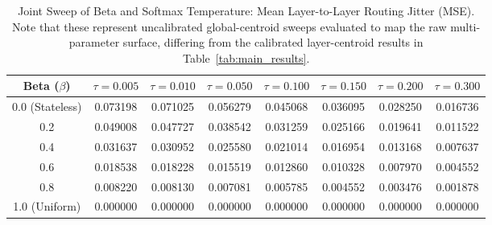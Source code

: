 \documentclass{article}
\theoremstyle{plain}
\theoremstyle{definition}
\theoremstyle{remark}
\begin{document}
\begin{table}[h]
\centering
\caption{Joint Sweep of Beta and Softmax Temperature: Mean Layer-to-Layer Routing Jitter (MSE). Note that these represent uncalibrated global-centroid sweeps evaluated to map the raw multi-parameter surface, differing from the calibrated layer-centroid results in Table~\ref{tab:main_results}.}
\label{tab:joint_jitter}
\vskip 0.1in
\begin{tabular}{cccccccc}
\toprule
\textbf{Beta} ($\beta$) & $\tau = 0.005$ & $\tau = 0.010$ & $\tau = 0.050$ & $\tau = 0.100$ & $\tau = 0.150$ & $\tau = 0.200$ & $\tau = 0.300$ \\
\midrule
0.0 (Stateless) & 0.073198 & 0.071025 & 0.056279 & 0.045068 & 0.036095 & 0.028250 & 0.016736 \\
0.2 & 0.049008 & 0.047727 & 0.038542 & 0.031259 & 0.025166 & 0.019641 & 0.011522 \\
0.4 & 0.031637 & 0.030952 & 0.025580 & 0.021014 & 0.016954 & 0.013168 & 0.007637 \\
0.6 & 0.018538 & 0.018228 & 0.015519 & 0.012860 & 0.010328 & 0.007970 & 0.004552 \\
0.8 & 0.008220 & 0.008130 & 0.007081 & 0.005785 & 0.004552 & 0.003476 & 0.001878 \\
1.0 (Uniform) & 0.000000 & 0.000000 & 0.000000 & 0.000000 & 0.000000 & 0.000000 & 0.000000 \\
\bottomrule
\end{tabular}
\end{table}
\end{document}
